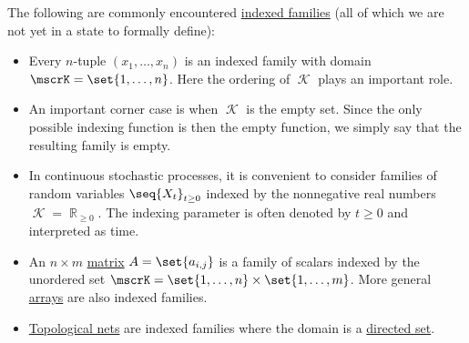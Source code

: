\begin{example}\label{ex:def:indexed_family}
  The following are commonly encountered \hyperref[def:indexed_family]{indexed families} (all of which we are not yet in a state to formally define):

  \begin{itemize}
    \item Every \( n \)-tuple \( (x_1, \ldots, x_n) \) is an indexed family with domain \( \mscrK = \set{ 1, \ldots, n } \). Here the ordering of \( \mscrK \) plays an important role.

    \item An important corner case is when \( \mscrK \) is the empty set. Since the only possible indexing function is then the empty function, we simply say that the resulting family is empty.

    \item In continuous stochastic processes, it is convenient to consider families of random variables \( \seq{ X_t }_{t \geq 0} \) indexed by the nonnegative real numbers \( \mscrK = \BbbR_{\geq 0} \). The indexing parameter is often denoted by \( t \geq 0 \) and interpreted as time.

    \item An \( n \times m \) \hyperref[def:array/matrix]{matrix} \( A = \set{ a_{i,j} } \) is a family of scalars indexed by the unordered set \( \mscrK = \set{ 1, \ldots, n } \times \set{ 1, \ldots, m } \). More general \hyperref[def:array]{arrays} are also indexed families.

    \item \hyperref[def:topological_net]{Topological nets} are indexed families where the domain is a \hyperref[def:directed_set]{directed set}.
  \end{itemize}
\end{example}


